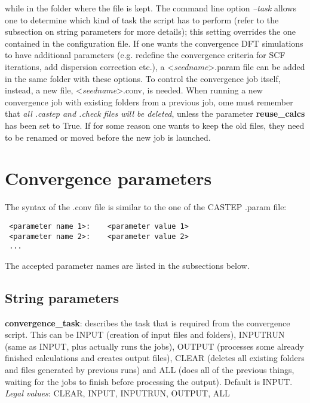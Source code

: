 \documentclass[10pt]{article}
\begin{document}
while in the folder where the file is kept. The command line option \textit{--task} allows one to determine which kind of task the script has to perform (refer to the subsection on string parameters for more details); this setting overrides the one contained in the configuration file. If one wants the convergence DFT simulations to have additional parameters (e.g. redefine the convergence criteria for SCF iterations, add dispersion correction etc.), a \textless \textit{seedname}\textgreater.param file can be added in the same folder with these options. To control the convergence job itself, instead, a new file, \textless \textit{seedname}\textgreater.conv, is needed.\newline
When running a new convergence job with existing folders from a previous job, ome must remember that \textit{all .castep and .check files will be deleted}, unless the parameter \textbf{reuse\_calcs} has been set to True. If for some reason one wants to keep the old files, they need to be renamed or moved before the new job is launched.

\section{Convergence parameters}

The syntax of the .conv file is similar to the one of the CASTEP .param file:

\begin{lstlisting}
 <parameter name 1>:    <parameter value 1>
 <parameter name 2>:    <parameter value 2>
 ...
\end{lstlisting}

The accepted parameter names are listed in the subsections below.

\subsection{String parameters}

\textbf{convergence\_task}: describes the task that is required from the convergence script. This can be INPUT (creation of input files and folders), INPUTRUN (same as INPUT, plus actually runs the jobs), OUTPUT (processes some already finished calculations and creates output files), CLEAR (deletes all existing folders and files generated by previous runs) and ALL (does all of the previous things, waiting for the jobs to finish before processing the output). Default is INPUT.\newline
\textit{Legal values}: CLEAR, INPUT, INPUTRUN, OUTPUT, ALL\newline
\end{document}

